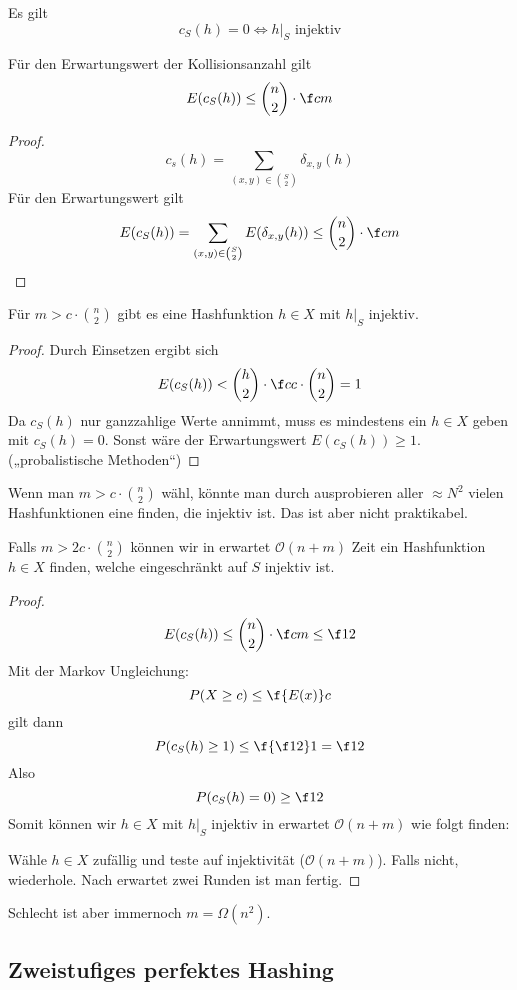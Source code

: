 \documentclass[11pt]{scrartcl}
\renewcommand{\O}{\mathcal{O}}
\begin{document}
Es gilt
\[
	c_S(h) = 0 \iff h\Big|_S \text{ injektiv}
\]

\begin{st}
	Für den Erwartungswert der Kollisionsanzahl gilt
	\[
		E(c_S(h)) \le \binom{n}2 \cdot \f cm
	\]
	\begin{proof}
		\[
			c_s(h) = \sum_{(x,y)\in \binom{S}{2}}\delta_{x,y}(h)
		\]
		Für den Erwartungswert gilt
		\[
			E(c_S(h)) = \sum_{(x,y)\in \binom S2}E(\delta_{x,y}(h)) \le \binom n2 \cdot \f cm
		\]		
	\end{proof}
\end{st}

\begin{kor}
	Für $m>c\cdot \binom n2$ gibt es eine Hashfunktion $h\in X$ mit $h\big|_S$ injektiv.
	\begin{proof}
		Durch Einsetzen ergibt sich
		\[
			E(c_S(h)) < \binom h2 \cdot \f c {c\cdot \binom n2} = 1
		\]
		Da $c_S(h)$ nur ganzzahlige Werte annimmt, muss es mindestens ein $h\in X$ geben mit $c_S(h) = 0$.
		Sonst wäre der Erwartungswert $E(c_S(h)) \ge 1$.
		(„probalistische Methoden“)
	\end{proof}
\end{kor}

Wenn man $m>c\cdot \binom n2$ wähl, könnte man durch ausprobieren aller $\approx N^2$ vielen Hashfunktionen eine finden, die injektiv ist.
Das ist aber nicht praktikabel.

\begin{kor}
	Falls $m > 2c\cdot \binom n2$ können wir in erwartet $\O(n+m)$ Zeit ein Hashfunktion $h\in X$ finden, welche eingeschränkt auf $S$ injektiv ist.
	\begin{proof}
		\[
			E(c_S(h)) \le \binom n2 \cdot \f cm \le \f 12
		\]
		Mit der Markov Ungleichung:
		\[
			P(X\ge c) \le \f{E(x)}c
		\]
		gilt dann
		\[
			P(c_S(h) \ge 1) \le \f{\f 12}1 = \f 12
		\]
		Also
		\[
			P(c_S(h)=0) \ge \f 12
		\]
		Somit können wir $h\in X$ mit $h\big|_S$ injektiv in erwartet $\O(n+m)$ wie folgt finden:

		Wähle $h\in X$ zufällig und teste auf injektivität ($\O(n+m)$).
		Falls nicht, wiederhole.
		Nach erwartet zwei Runden ist man fertig.
	\end{proof}
\end{kor}

Schlecht ist aber immernoch $m=\Omega(n^2)$.


\subsection{Zweistufiges perfektes Hashing}
\end{document}
